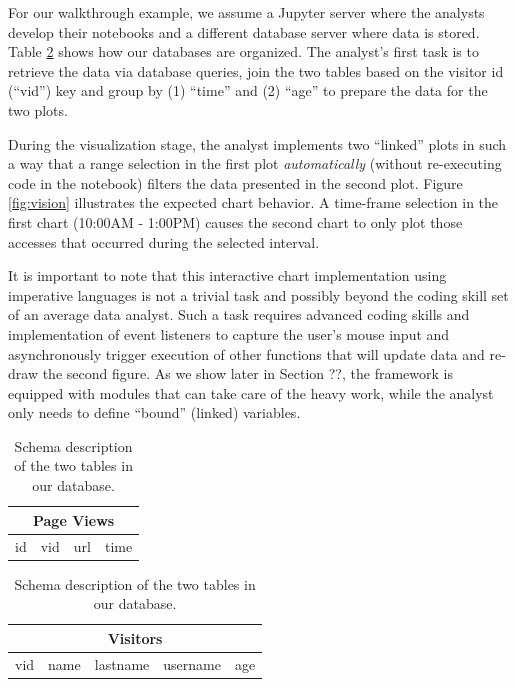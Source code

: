For our walkthrough example, we assume a Jupyter server where the analysts develop their notebooks and a different database server where data is stored. Table \ref{tab:schema} shows how our databases are organized. The analyst's first task is to retrieve the data via database queries, join the two tables based on the visitor id (``vid'') key and group by (1) ``time'' and (2) ``age'' to prepare the data for the two plots.

During the visualization stage, the analyst implements two ``linked'' plots in such a way that a range selection in the first plot \textit{automatically} (without re-executing code in the notebook) filters the data presented in the second plot. Figure \ref{fig:vision} illustrates the expected chart behavior. A time-frame selection in the first chart (10:00AM - 1:00PM) causes the second chart to only plot those accesses that occurred during the selected interval. 

It is important to note that this interactive chart implementation using imperative languages is not a trivial task and possibly beyond the coding skill set of an average data analyst. Such a task requires advanced coding skills and implementation of event listeners to capture the user's mouse input and asynchronously trigger execution of other functions that will update data and re-draw the second figure. As we show later in Section ??, the {\projname} framework is equipped with modules that can take care of the heavy work, while the analyst only needs to define ``bound'' (linked) variables.

\begin{table}
\begin{center}

\begin{tabular}{|c|c|c|c|}
\hline 
\multicolumn{4}{|c|}{Page Views} \\ 
\hline 
id & vid & url & time \\ 
\hline 
\end{tabular} 

\hfill

\begin{tabular}{|c|c|c|c|c|}
\hline 
\multicolumn{5}{|c|}{Visitors} \\ 
\hline 
vid & name & lastname & username & age \\ 
\hline 
\end{tabular} 

\end{center}
\caption{Schema description of the two tables in our database.}
\label{tab:schema}
\end{table}

